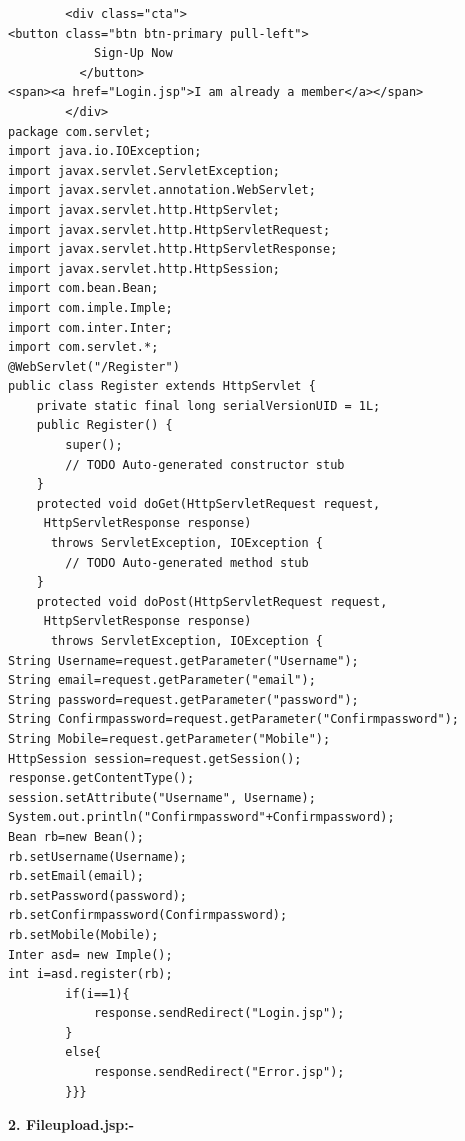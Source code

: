 \documentclass[BTech]{srmuthesis}
\begin{document}
\begin{verbatim}
        <div class="cta">
<button class="btn btn-primary pull-left">
            Sign-Up Now
          </button>
<span><a href="Login.jsp">I am already a member</a></span> 
        </div>
package com.servlet;
import java.io.IOException;
import javax.servlet.ServletException;
import javax.servlet.annotation.WebServlet;
import javax.servlet.http.HttpServlet;
import javax.servlet.http.HttpServletRequest;
import javax.servlet.http.HttpServletResponse;
import javax.servlet.http.HttpSession;
import com.bean.Bean;
import com.imple.Imple;
import com.inter.Inter;
import com.servlet.*;
@WebServlet("/Register")
public class Register extends HttpServlet {
	private static final long serialVersionUID = 1L;
    public Register() {
        super();
        // TODO Auto-generated constructor stub
    }
	protected void doGet(HttpServletRequest request,
	 HttpServletResponse response)
	  throws ServletException, IOException {
		// TODO Auto-generated method stub
	}
	protected void doPost(HttpServletRequest request,
	 HttpServletResponse response)
	  throws ServletException, IOException {
String Username=request.getParameter("Username");
String email=request.getParameter("email");
String password=request.getParameter("password");
String Confirmpassword=request.getParameter("Confirmpassword");
String Mobile=request.getParameter("Mobile");
HttpSession session=request.getSession();
response.getContentType();
session.setAttribute("Username", Username);
System.out.println("Confirmpassword"+Confirmpassword);
Bean rb=new Bean();
rb.setUsername(Username);
rb.setEmail(email);
rb.setPassword(password);
rb.setConfirmpassword(Confirmpassword);
rb.setMobile(Mobile);
Inter asd= new Imple();
int i=asd.register(rb);
		if(i==1){
			response.sendRedirect("Login.jsp");
		}                          
		else{
			response.sendRedirect("Error.jsp");
		}}}        
\end{verbatim}
\textbf{2. Fileupload.jsp:-}
\end{document}
